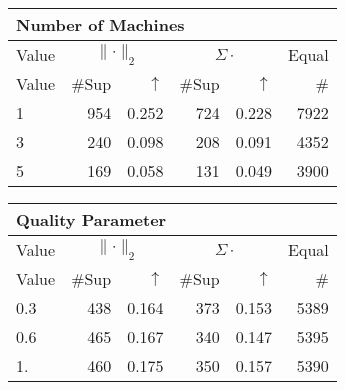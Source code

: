 \begin{center}
\renewcommand{\tabcolsep}{4pt}
\renewcommand{\arraystretch}{1.1}
\begin{customnormal}
\begin{tabular}{lrrrrr}
\multicolumn{6}{l}{Number of Machines}\\
\toprule
\multicolumn{1}{c}{Value} & \multicolumn{2}{c}{$\lVert \cdot \rVert_2$} & \multicolumn{2}{c}{$\Sigma \cdot$} & \multicolumn{1}{c}{Equal} \\ 
\cmidrule(lr){1-1} \cmidrule(lr){2-3} \cmidrule(lr){4-5}  \cmidrule(lr){6-6}
Value & \#Sup & $\uparrow$ & \#Sup & $\uparrow$ & \# \\ 
\midrule
1 & 954 & 0.252 & 724 & 0.228 & 7922 \\ 
3 & 240 & 0.098 & 208 & 0.091 & 4352 \\ 
5 & 169 & 0.058 & 131 & 0.049 & 3900 \\ 
\bottomrule
\end{tabular}


\end{customnormal}
\end{center}
\begin{center}
\renewcommand{\tabcolsep}{4pt}
\renewcommand{\arraystretch}{1.1}
\begin{customnormal}
\begin{tabular}{lrrrrr}
\multicolumn{6}{l}{Quality Parameter}\\
\toprule
\multicolumn{1}{c}{Value} & \multicolumn{2}{c}{$\lVert \cdot \rVert_2$} & \multicolumn{2}{c}{$\Sigma \cdot$} & \multicolumn{1}{c}{Equal} \\ 
\cmidrule(lr){1-1} \cmidrule(lr){2-3} \cmidrule(lr){4-5}  \cmidrule(lr){6-6}
Value & \#Sup & $\uparrow$ & \#Sup & $\uparrow$ & \# \\ 
\midrule
0.3 & 438 & 0.164 & 373 & 0.153 & 5389 \\ 
0.6 & 465 & 0.167 & 340 & 0.147 & 5395 \\ 
1. & 460 & 0.175 & 350 & 0.157 & 5390 \\ 
\bottomrule
\end{tabular}


\end{customnormal}
\end{center}
